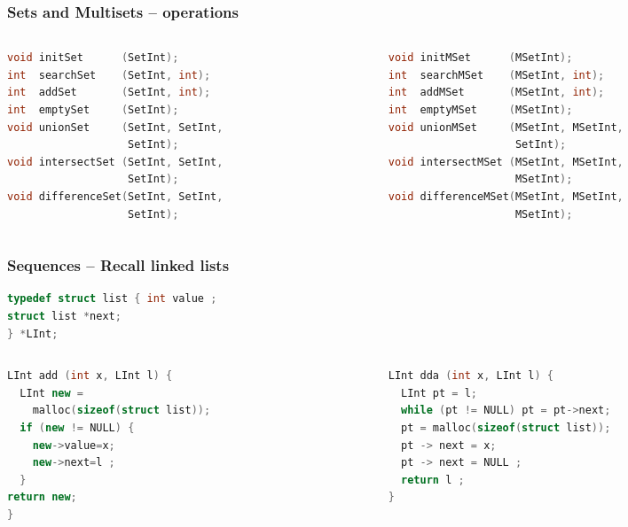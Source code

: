 \documentclass[aspectratio=169]{beamer}
\begin{document}
\begin{frame}[fragile]\frametitle{Sets and Multisets -- operations}
\centering

\begin{columns}
\begin{column}{.48\textwidth}
\begin{lstlisting}[language=C++]
void initSet      (SetInt);
int  searchSet    (SetInt, int);
int  addSet       (SetInt, int);
int  emptySet     (SetInt);
void unionSet     (SetInt, SetInt,
                   SetInt);
void intersectSet (SetInt, SetInt,
                   SetInt);
void differenceSet(SetInt, SetInt,
                   SetInt);
\end{lstlisting}
%
\end{column}
\begin{column}{.50\textwidth}
%
\begin{lstlisting}[language=C++]
void initMSet      (MSetInt); 
int  searchMSet    (MSetInt, int);
int  addMSet       (MSetInt, int);
int  emptyMSet     (MSetInt);
void unionMSet     (MSetInt, MSetInt,
                    SetInt);
void intersectMSet (MSetInt, MSetInt,
                    MSetInt); 
void differenceMSet(MSetInt, MSetInt,
                    MSetInt);
\end{lstlisting}
%
\end{column}
\end{columns}

\end{frame}

\begin{frame}[fragile]\frametitle{Sequences -- Recall linked lists}
  
\begin{lstlisting}[language=C++,emph={list,LInt}]
typedef struct list { int value ;
struct list *next;
} *LInt;
\end{lstlisting}

\begin{columns}
\begin{column}{.48\textwidth}
\begin{lstlisting}[language=C++, emph={prev,LInt}]
LInt add (int x, LInt l) {
  LInt new =
    malloc(sizeof(struct list));
  if (new != NULL) {
    new->value=x;
    new->next=l ;
  }
return new;
}
\end{lstlisting}
%
\end{column}
\begin{column}{.50\textwidth}
%
\begin{lstlisting}[language=C++, emph={prev,LInt}]
LInt dda (int x, LInt l) {
  LInt pt = l;
  while (pt != NULL) pt = pt->next;
  pt = malloc(sizeof(struct list));
  pt -> next = x;
  pt -> next = NULL ;
  return l ;
}
\end{lstlisting}
%
\end{column}
\end{columns}
\end{frame}
\end{document}

